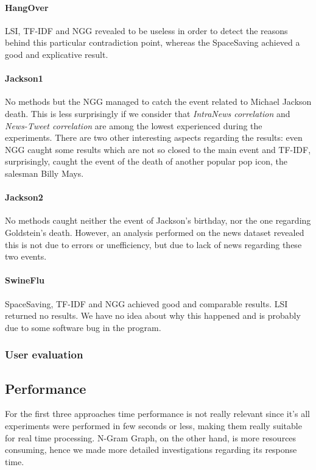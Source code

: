 \paragraph*{HangOver}
LSI, TF-IDF and NGG revealed to be useless in order to detect the reasons behind
this particular contradiction point, whereas the SpaceSaving achieved a good and
explicative result.

\paragraph*{Jackson1}
No methods but the NGG managed to catch the event related to
Michael Jackson death. This is less surprisingly if we consider that
\emph{IntraNews correlation} and \emph{News-Tweet correlation} are among the
lowest experienced during the experiments.
There are two other interesting aspects regarding the
results: even NGG caught some results which are not so closed to the main event
and TF-IDF, surprisingly, caught the event of the death of another popular pop
icon, the salesman Billy Mays.

\paragraph*{Jackson2}
No methods caught neither the event of Jackson's birthday, nor the one regarding
Goldstein's death. However, an analysis performed on the news dataset revealed
this is not due to errors or unefficiency, but due to lack of news regarding
these two events.

\paragraph*{SwineFlu}
SpaceSaving, TF-IDF and NGG achieved good and comparable results. LSI returned
no results. We have no idea about why this happened and is probably due to some
software bug in the program.

\subsubsection*{User evaluation}

\subsection*{Performance}
For the first three approaches time performance is not really relevant since it's all experiments were performed in few seconds or less, making them really suitable for real time processing. N-Gram Graph, on the other hand, is more resources consuming, hence we made more detailed investigations regarding its  response time.

